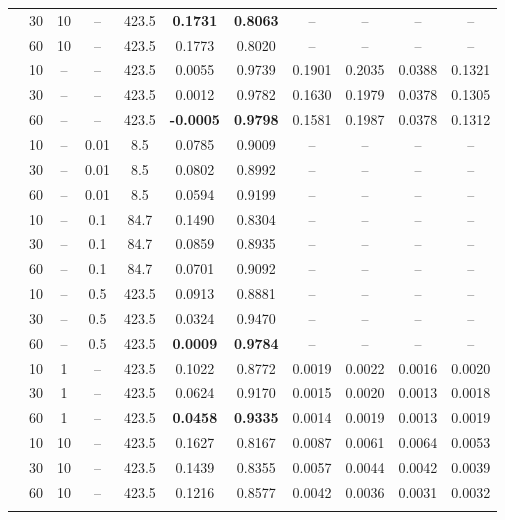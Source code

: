 \documentclass[11pt,twocolumn,a4paper,DIV=calc,parskip=half]{scrartcl}
\begin{document}
\begin{longtable}{@{}l c c c c c c c c c c@{}}
	& 30 & 10 & -- & 423.5 & \textbf{0.1731} & \textbf{0.8063} & -- & -- & -- & -- \\
	& 60 & 10 & -- & 423.5 & 0.1773 & 0.8020 & -- & -- & -- & -- \\
	\arrayrulecolor{gray!60}\midrule\arrayrulecolor{black}
	\multirow{3}{*}{\textbf{FLTrust}} & 10 & -- & -- & 423.5 & 0.0055 & 0.9739 & 0.1901 & 0.2035 & 0.0388 & 0.1321 \\
	& 30 & -- & -- & 423.5 & 0.0012 & 0.9782 & 0.1630 & 0.1979 & 0.0378 & 0.1305 \\
	& 60 & -- & -- & 423.5 & \textbf{-0.0005} & \textbf{0.9798} & 0.1581 & 0.1987 & 0.0378 & 0.1312 \\
	\arrayrulecolor{gray!60}\midrule\arrayrulecolor{black}
	\multirow{9}{*}{\textbf{TopK}} & 10 & -- & 0.01 & 8.5 & 0.0785 & 0.9009 & -- & -- & -- & -- \\
	& 30 & -- & 0.01 & 8.5 & 0.0802 & 0.8992 & -- & -- & -- & -- \\
	& 60 & -- & 0.01 & 8.5 & 0.0594 & 0.9199 & -- & -- & -- & -- \\
	& 10 & -- & 0.1 & 84.7 & 0.1490 & 0.8304 & -- & -- & -- & -- \\
	& 30 & -- & 0.1 & 84.7 & 0.0859 & 0.8935 & -- & -- & -- & -- \\
	& 60 & -- & 0.1 & 84.7 & 0.0701 & 0.9092 & -- & -- & -- & -- \\
	& 10 & -- & 0.5 & 423.5 & 0.0913 & 0.8881 & -- & -- & -- & -- \\
	& 30 & -- & 0.5 & 423.5 & 0.0324 & 0.9470 & -- & -- & -- & -- \\
	& 60 & -- & 0.5 & 423.5 & \textbf{0.0009} & \textbf{0.9784} & -- & -- & -- & -- \\
	\arrayrulecolor{gray!60}\midrule\arrayrulecolor{black}
	\multirow{6}{*}{\textbf{DP + FLTrust}} & 10 & 1 & -- & 423.5 & 0.1022 & 0.8772 & 0.0019 & 0.0022 & 0.0016 & 0.0020 \\
	& 30 & 1 & -- & 423.5 & 0.0624 & 0.9170 & 0.0015 & 0.0020 & 0.0013 & 0.0018 \\
	& 60 & 1 & -- & 423.5 & \textbf{0.0458} & \textbf{0.9335} & 0.0014 & 0.0019 & 0.0013 & 0.0019 \\
	& 10 & 10 & -- & 423.5 & 0.1627 & 0.8167 & 0.0087 & 0.0061 & 0.0064 & 0.0053 \\
	& 30 & 10 & -- & 423.5 & 0.1439 & 0.8355 & 0.0057 & 0.0044 & 0.0042 & 0.0039 \\
	& 60 & 10 & -- & 423.5 & 0.1216 & 0.8577 & 0.0042 & 0.0036 & 0.0031 & 0.0032 \\
	\arrayrulecolor{gray!60}\midrule\arrayrulecolor{black}

\end{longtable}
\end{document}
